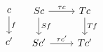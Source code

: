 \begin{figure}[H]
\centering

\[ \begin{array}{cc}
\begin{tikzcd}
	c \arrow[d, "f"]\\
	c'
\end{tikzcd}

&

\begin{tikzcd}
	Sc \arrow[r, "\tau c"] \arrow[d, "Sf"] & Tc \arrow[d, "Tf"]\\
	Sc' \arrow[r, "\tau c'"]				 & Tc'
\end{tikzcd}
\end{array} \]

\end{figure}